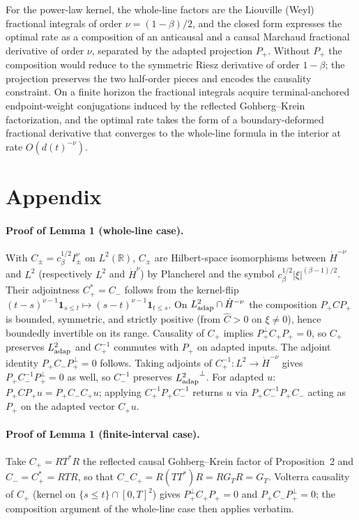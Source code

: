\documentclass[11pt]{article}
\newcommand{\R}{\mathbb{R}}
\newcommand{\adap}{{\rm adap}}
\newcommand{\Ldot}[1]{\dot H^{#1}}
\theoremstyle{plain}
\begin{document}
For the power-law kernel, the whole-line factors are the Liouville (Weyl) fractional integrals of order $\nu = (1-\beta)/2$, and the closed form expresses the optimal rate as a composition of an anticausal and a causal Marchaud fractional derivative of order $\nu$, separated by the adapted projection $P_+$. Without $P_+$ the composition would reduce to the symmetric Riesz derivative of order $1-\beta$; the projection preserves the two half-order pieces and encodes the causality constraint. On a finite horizon the fractional integrals acquire terminal-anchored endpoint-weight conjugations induced by the reflected Gohberg--Krein factorization, and the optimal rate takes the form of a boundary-deformed fractional derivative that converges to the whole-line formula in the interior at rate $O(d(t)^{-\nu})$.

\appendix
\section{Appendix}

\paragraph{Proof of Lemma 1 (whole-line case).} With $C_\pm = c_\beta^{1/2} I_\pm^\nu$ on $L^2(\R)$, $C_\pm$ are Hilbert-space isomorphisms between $\Ldot{-\nu}$ and $L^2$ (respectively $L^2$ and $\Ldot{\nu}$) by Plancherel and the symbol $c_\beta^{1/2}|\xi|^{(\beta-1)/2}$. Their adjointness $C_+^* = C_-$ follows from the kernel-flip $(t-s)^{\nu-1}\mathbf{1}_{s\le t}\mapsto(s-t)^{\nu-1}\mathbf{1}_{t\le s}$. On $L^2_{\adap}\cap\Ldot{-\nu}$ the composition $P_+ C P_+$ is bounded, symmetric, and strictly positive (from $\hat C > 0$ on $\xi\ne 0$), hence boundedly invertible on its range. Causality of $C_+$ implies $P_+^\perp C_+ P_+ = 0$, so $C_+$ preserves $L^2_{\adap}$ and $C_+^{-1}$ commutes with $P_+$ on adapted inputs. The adjoint identity $P_+ C_- P_+^\perp = 0$ follows. Taking adjoints of $C_+^{-1}\colon L^2 \to \Ldot{-\nu}$ gives $P_+ C_-^{-1} P_+^\perp = 0$ as well, so $C_-^{-1}$ preserves ${L^2_{\adap}}^\perp$. For adapted $u$: $P_+ C P_+ u = P_+ C_- C_+ u$; applying $C_+^{-1} P_+ C_-^{-1}$ returns $u$ via $P_+ C_-^{-1} P_+ C_-$ acting as $P_+$ on the adapted vector $C_+ u$.

\paragraph{Proof of Lemma 1 (finite-interval case).} Take $C_+ = RT^*R$ the reflected causal Gohberg--Krein factor of Proposition~2 and $C_- = C_+^* = RTR$, so that $C_-C_+ = R(TT^*)R = RG_TR = G_T$. Volterra causality of $C_+$ (kernel on $\{s\le t\}\cap[0,T]^2$) gives $P_+^\perp C_+ P_+ = 0$ and $P_+ C_- P_+^\perp = 0$; the composition argument of the whole-line case then applies verbatim.
\end{document}
